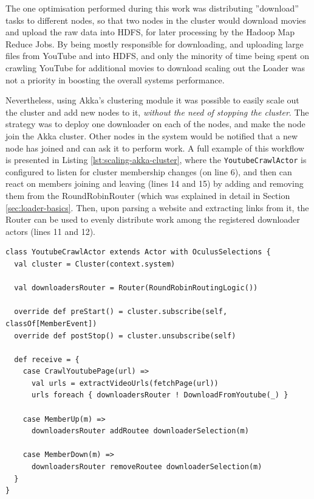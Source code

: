 The one optimisation performed during this work was distributing ''download'' tasks to different nodes, so that two nodes in the cluster would download movies and upload the raw data into HDFS, for later processing by the Hadoop Map Reduce Jobs. By being mostly responsible for downloading, and uploading large files from YouTube and into HDFS, and only the minority of time being spent on crawling YouTube for additional movies to download scaling out the Loader was not a priority in boosting the overall systems performance.

Nevertheless, using Akka's clustering module it was possible to easily scale out the cluster and add new nodes to it, \textit{without the need of stopping the cluster}. The strategy was to deploy one downloader on each of the nodes, and make the node join the Akka cluster. Other nodes in the system would be notified that a new node has joined and can ask it to perform work. A full example of this workflow is presented in Listing \ref{lst:scaling-akka-cluster}, where the \verb|YoutubeCrawlActor| is configured to listen for cluster membership changes (on line 6), and then can react on members joining and leaving (lines 14 and 15) by adding and removing them from the RoundRobinRouter (which was explained in detail in Section \ref{sec:loader-basics}. Then, upon parsing a website and extracting links from it, the Router can be used to evenly distribute work among the registered downloader actors (lines 11 and 12).


\begin{lstlisting}[caption={Listening for Cluster events in Akka allows the application to dynamically respond to nodes being added to the cluster, and spreading the load in application logic to other nodes.}, label={lst:scaling-akka-cluster}]
class YoutubeCrawlActor extends Actor with OculusSelections {
  val cluster = Cluster(context.system)

  val downloadersRouter = Router(RoundRobinRoutingLogic())

  override def preStart() = cluster.subscribe(self, classOf[MemberEvent])
  override def postStop() = cluster.unsubscribe(self)

  def receive = {
    case CrawlYoutubePage(url) =>
      val urls = extractVideoUrls(fetchPage(url))
      urls foreach { downloadersRouter ! DownloadFromYoutube(_) }

    case MemberUp(m) => 
      downloadersRouter addRoutee downloaderSelection(m)
    
    case MemberDown(m) => 
      downloadersRouter removeRoutee downloaderSelection(m)
  }
}
\end{lstlisting}

